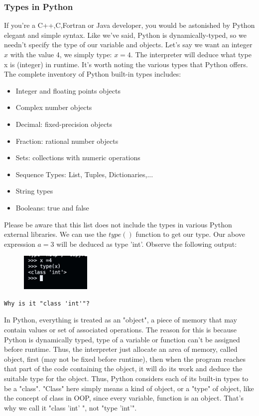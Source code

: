 \documentclass[twoside,final]{hcmut-report}
\begin{document}
\subsubsection{Types in Python}
\hspace*{1mm} If you're a C++,C,Fortran or Java developer, you would be astonished by Python elegant and simple syntax. Like we've said, Python is dynamically-typed, so we needn't specify the type of our variable and objects. Let's say we want an integer \textbf{$x$} with the value 4, we simply type: $x = 4$. The interpreter will deduce what type x is (integer) in runtime. It's worth noting the various types that Python offers. The complete inventory of Python built-in types includes:
\begin{itemize}
\item Integer and floating points objects
\item Complex number objects
\item Decimal: fixed-precision objects
\item Fraction: rational number objects
\item Sets: collections with numeric operations
\item Sequence Types: List, Tuples, Dictionaries,...
\item String types
\item Booleans: true and false
\end{itemize}
\hspace*{6.5mm} Please be aware that this list does not include the types in various Python external libraries. We can use the $type()$ function to get our type. Our above expression $a = 3 $ will be deduced as type 'int'. Observe the following output: 
\begin{figure}[ht]
\centering
\includegraphics[width=0.3\textwidth]{graphics/python2}
\end{figure}
\begin{center}
\begin{verbatim}
Why is it "class 'int'"?
\end{verbatim}
\end{center}
\hspace*{6.5mm} In Python, everything is treated as an "object", a piece of memory that may contain values or set of associated operations. The reason for this is because Python is dynamically typed, type of a variable or function can't be assigned before runtime. Thus, the interpreter just allocate an area of memory, called object, first (may not be fixed before runtime), then when the program reaches that part of the code containing the object, it will do its work and deduce the suitable type for the object. Thus, Python considers each of its built-in types to be a "class". "Class" here simply means a kind of object, or a "type" of object, like the concept of class in OOP, since every variable, function is an object. That's why we call it "class 'int' ", not "type 'int'".\\
\end{document}

